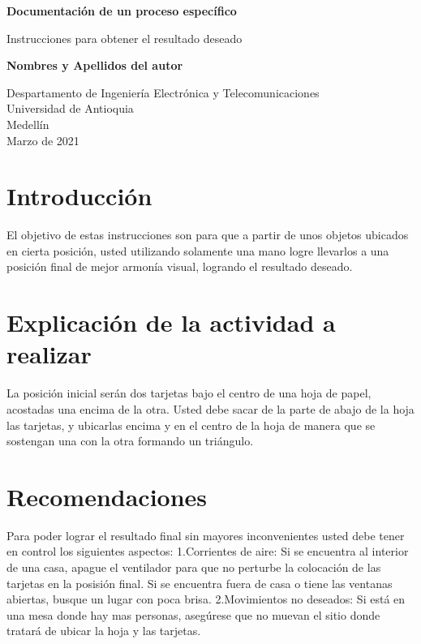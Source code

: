 \documentclass{article}
\begin{document}
\begin{titlepage}
    \begin{center}
        \vspace*{1cm}
            
        \Huge
        \textbf{Documentación de un proceso específico}
            
        \vspace{0.5cm}
        \LARGE
        Instrucciones para obtener el resultado deseado
            
        \vspace{1.5cm}
            
        \textbf{Nombres y Apellidos del autor}
            
        \vfill
            
        \vspace{0.8cm}
            
        \Large
        Despartamento de Ingeniería Electrónica y Telecomunicaciones\\
        Universidad de Antioquia\\
        Medellín\\
        Marzo de 2021
            
    \end{center}
\end{titlepage}

\tableofcontents
\newpage
\section{Introducción}\label{intro}
El objetivo de estas instrucciones son para que a partir de unos objetos ubicados en cierta posición, usted utilizando solamente una mano logre llevarlos a una posición final de mejor armonía visual, logrando el resultado deseado.

\section{Explicación de la actividad a realizar}\label{explicación}
La posición inicial serán dos tarjetas bajo el centro de una hoja de papel, acostadas una encima de la otra. Usted debe sacar de la parte de abajo de la hoja las tarjetas, y ubicarlas encima y en el centro de la hoja de manera que se sostengan una con la otra formando un triángulo.

\section{Recomendaciones} \label{recomendaciones}
Para poder lograr el resultado final sin mayores inconvenientes usted debe tener en control los siguientes aspectos:
 1.Corrientes de aire: Si se encuentra al interior de una casa, apague el ventilador para que no perturbe la colocación de las tarjetas en la posisión final. Si se encuentra fuera de casa o tiene las ventanas abiertas, busque un lugar con poca brisa.
 2.Movimientos no deseados: Si está en una mesa donde hay mas personas, asegúrese que no muevan el sitio donde tratará de ubicar la hoja y las tarjetas.
\end{document}
